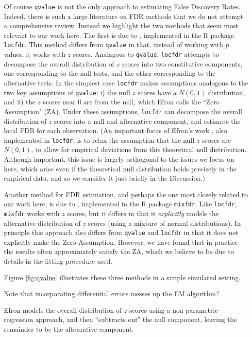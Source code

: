 \documentclass[11pt]{article}
\def\qvalue{{\tt qvalue}\xspace}
\def\locfdr{{\tt locfdr}\xspace}
\def\mixfdr{{\tt mixfdr}\xspace}
\begin{document}
 Of course \qvalue is not the only approach to estimating False Discovery Rates. Indeed, there is such a large
 literature on FDR methods that we do not attempt a comprehensive review. Instead we highlight the two methods that
 seem most relevant to our work here. The first is due to \cite{efron.xx}, implemented in the R package \locfdr.
 This method differs from \qvalue in that, instead of working with $p$ values, it works with $z$ scores.
 Analagous to \qvalue, \locfdr attempts to decompose the overall distribution of $z$ scores into two constitutive components,
 one corresponding to the null tests, and the other corresponding to the alternative tests. 
 In the simplest case
 \locfdr  makes assumptions analogous to the two key assumptions of \qvalue: i) the null $z$ scores have a $N(0,1)$ distribution,
 and ii) the $z$ scores near 0 are from the null, which Efron
calls the ``Zero Assumption" (ZA). Under these assumptions, \locfdr can decompose the
overall distribution of $z$ scores into a null and alternative component, and estimate the local FDR for each observation. 
 (An important focus of Efron's work \cite{}, also implemented in \locfdr, 
 is to relax the assumption that the null $z$ scores are $N(0,1)$, to allow for empirical deviations from this
theoretical null distribution. Although important, this issue is largely orthogonal to the issues we focus on here, which arise
even if the theoretical null distribution holds precisely in the empirical data, and so we consider it just briefly in the Discussion.) 

Another method for FDR estimation, and perhaps the one most closely related to our
work here, is due to \cite{muralidharan.xx}, implemented in the R package \mixfdr.
Like \locfdr, \mixfdr works with $z$ scores, but it differs in that it {\it explicitly} models the alternative
distribution of $z$ scores (using a mixture of normal distributions). In principle this approach also differs from \qvalue and \locfdr in
that it does not explicitly make the Zero Assumption. However, we have found that in practice the results often approximately satisfy the ZA,
which we believe to be due to details in the fitting procedure used.

Figure \ref{fig:qvalue} illustrates these three methods in a simple simulated setting. 



Note that incorporating differential errors messes up the EM algorithm?

Efron models the overall distribution of $z$ scores using a non-parametric regression approach, and then ``subtracts out" the
null component, leaving the remainder to be the alternative component. 
\end{document}
